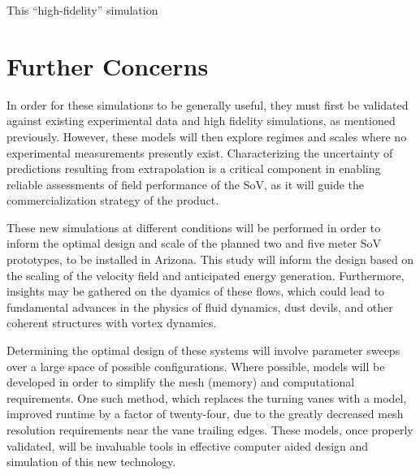 \documentclass{article}
\begin{document}
This ``high-fidelity'' simulation

%
%




%
%
\section{Further Concerns}


In order for these simulations to be generally useful, they must first
be validated against existing experimental data and high fidelity
simulations, as mentioned previously. 
However, these models will then explore regimes and scales where no
experimental measurements presently exist. Characterizing the
uncertainty of predictions resulting from extrapolation is a critical
component in enabling reliable assessments of field performance of the
SoV, as it will guide the commercialization strategy of the product.

These new simulations at different conditions will be performed in order
to inform the optimal design and scale of the planned two and five meter
SoV prototypes, to be installed in Arizona. This study will inform the
design based on the scaling of the velocity field and anticipated energy
generation. Furthermore, insights may be gathered on the dyamics of
these flows, which could lead to fundamental advances in the physics of
fluid dynamics, dust devils, and other coherent structures with vortex 
dynamics\cite{Mullen1977181,smithleslie,kanak}. 


Determining the optimal design of these systems will involve parameter
sweeps over a large space of possible configurations. Where possible,
models will be developed in order to simplify the mesh (memory) and
computational requirements. One such method, which replaces the turning
vanes with a model, improved runtime by a factor of twenty-four, due to
the greatly decreased mesh resolution requirements near the vane
trailing edges. These models, once properly validated, will be
invaluable tools in effective computer aided design and simulation of
this new technology.  







%
%
%
%
\end{document}
